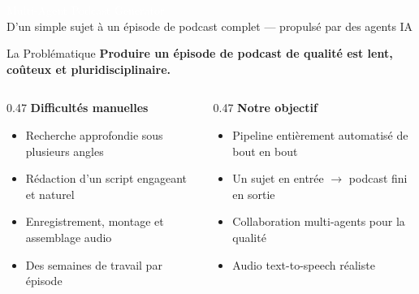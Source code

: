 \documentclass[aspectratio=169, 11pt]{beamer}
\begin{document}
{
\begin{frame}[plain]
\vfill
\begin{center}
  {\textcolor{white}{Multi-Agent Podcast Generator}}\\[0.6cm]
  {\large\textcolor{white!90!accent}{D'un simple sujet à un épisode de podcast complet — propulsé par des agents IA}}
\end{center}
\vfill
\end{frame}
}

\begin{frame}{La Problématique}
\vspace{0.2cm}
{\color{accent}\bfseries Produire un épisode de podcast de qualité est lent, coûteux et pluridisciplinaire.}

\vspace{0.3cm}
\begin{columns}[T]
  \begin{column}{0.47\textwidth}
    \textbf{Difficultés manuelles}
    \begin{itemize}
      \item Recherche approfondie sous plusieurs angles
      \item Rédaction d'un script engageant et naturel
      \item Enregistrement, montage et assemblage audio
      \item Des semaines de travail par épisode
    \end{itemize}
  \end{column}
  \begin{column}{0.47\textwidth}
    \textbf{Notre objectif}
    \begin{itemize}
      \item Pipeline entièrement automatisé de bout en bout
      \item Un sujet en entrée $\rightarrow$ podcast fini en sortie
      \item Collaboration multi-agents pour la qualité
      \item Audio text-to-speech réaliste
    \end{itemize}
  \end{column}
\end{columns}
\end{frame}
\end{document}
